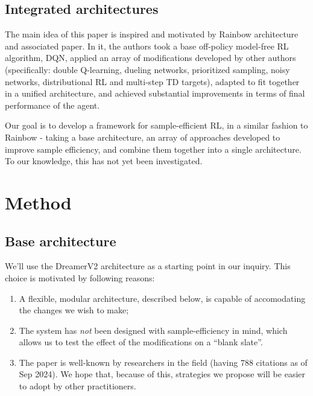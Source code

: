 \documentclass[twoside,11pt]{article}
\begin{document}
\subsection{Integrated architectures}

The main idea of this paper is inspired and motivated by Rainbow architecture and associated paper. In it, the authors took a base off-policy model-free RL algorithm, DQN, applied an array of modifications developed by other authors (specifically: double Q-learning, dueling networks, prioritized sampling, noisy networks, distributional RL and multi-step TD targets), adapted to fit together in a unified architecture, and achieved substantial improvements in terms of final performance of the agent.

Our goal is to develop a framework for sample-efficient RL, in a similar fashion to Rainbow - taking a base architecture, an array of approaches developed to improve sample efficiency, and combine them together into a single architecture. To our knowledge, this has not yet been investigated.

\section{Method}


\subsection{Base architecture}

We'll use the DreamerV2 architecture as a starting point in our inquiry. This choice is motivated by following reasons:

\begin{enumerate}
  \item A flexible, modular architecture, described below, is capable of accomodating the changes we wish to make;
  \item The system has \emph{not} been designed with sample-efficiency in mind, which allows us to test the effect of the modifications on a ``blank slate''.
  \item The paper is well-known by researchers in the field (having 788 citations as of Sep 2024). We hope that, because of this, strategies we propose will be easier to adopt by other practitioners.
\end{enumerate}
\end{document}
